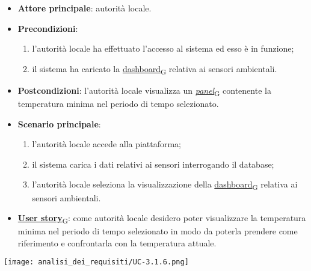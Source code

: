 \newpage
{}
\begin{itemize}
	\item \textbf{Attore principale}: autorità locale.
	\item \textbf{Precondizioni}:
	      \begin{enumerate}
		      \item l'autorità locale ha effettuato l'accesso al sistema ed esso è in funzione;
		      \item il sistema ha caricato la \href{https://7last.github.io/docs/pb/documentazione-interna/glossario\#dashboard}{dashboard\textsubscript{G}} relativa ai sensori ambientali.
	      \end{enumerate}
	\item \textbf{Postcondizioni}: l'autorità locale visualizza un \href{https://7last.github.io/docs/pb/documentazione-interna/glossario\#panel}{\textit{panel}\textsubscript{G}} contenente la temperatura minima nel periodo di tempo selezionato.
	\item \textbf{Scenario principale}:
	      \begin{enumerate}
		      \item l'autorità locale accede alla piattaforma;
		      \item il sistema carica i dati relativi ai sensori interrogando il database;
		      \item l'autorità locale seleziona la visualizzazione della \href{https://7last.github.io/docs/pb/documentazione-interna/glossario\#dashboard}{dashboard\textsubscript{G}} relativa ai sensori ambientali.
	      \end{enumerate}
	\item \href{https://7last.github.io/docs/pb/documentazione-interna/glossario\#user-story}{\textbf{User story}\textsubscript{G}}:
	      come autorità locale desidero poter visualizzare la temperatura minima nel periodo di tempo selezionato
	      in modo da poterla prendere come riferimento e confrontarla con la temperatura attuale.
\end{itemize}
\begin{center}
	\texttt{[image: analisi\_dei\_requisiti/UC-3.1.6.png]}
\end{center}

